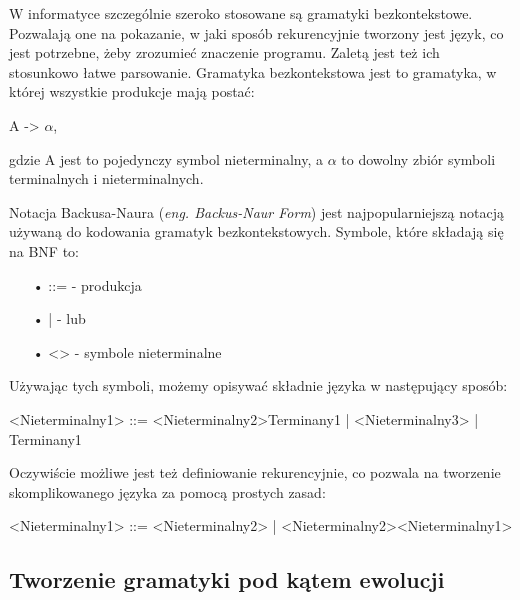 W informatyce szczególnie szeroko stosowane są gramatyki bezkontekstowe. Pozwalają one na pokazanie, w jaki sposób rekurencyjnie tworzony jest język, co jest potrzebne, żeby zrozumieć znaczenie programu. Zaletą jest też ich stosunkowo łatwe parsowanie.
Gramatyka bezkontekstowa jest to gramatyka, w której wszystkie produkcje mają postać:
\begin{center}
	A -> {$\alpha$},
\end{center}
gdzie A jest to pojedynczy symbol nieterminalny, a $\alpha$ to dowolny zbiór symboli terminalnych i nieterminalnych.
	
Notacja Backusa-Naura (\textit{eng. Backus-Naur Form}) \cite{Backus1959TheSA}\cite{Naur}\cite{Knuth1964} jest najpopularniejszą notacją używaną do kodowania gramatyk bezkontekstowych. Symbole, które składają się na BNF to:

\begin{itemize}
  \item[•] ::= - produkcja
  \item[•] |   - lub
  \item[•] <>  - symbole nieterminalne
\end{itemize}

Używając tych symboli, możemy opisywać składnie języka w następujący sposób:
\begin{center}
<Nieterminalny1> ::= <Nieterminalny2>Terminany1 | <Nieterminalny3> | Terminany1
\end{center}
Oczywiście możliwe jest też definiowanie rekurencyjnie, co pozwala na tworzenie skomplikowanego języka za pomocą prostych zasad: 
\begin{center}
<Nieterminalny1> ::= <Nieterminalny2> | <Nieterminalny2><Nieterminalny1>
\end{center}

\subsection{Tworzenie gramatyki pod kątem ewolucji}

